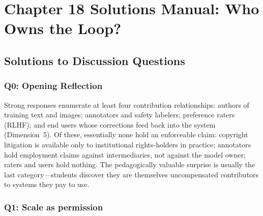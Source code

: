 
\section*{Chapter 18 Solutions Manual: Who Owns the Loop?}

\subsection*{Solutions to Discussion Questions}

\subsubsection*{Q0: Opening Reflection}

Strong responses enumerate at least four contribution relationships: authors of training text and images; annotators and safety labelers; preference raters (RLHF); and end users whose corrections feed back into the system (Dimension~5). Of these, essentially none hold an enforceable claim: copyright litigation is available only to institutional rights-holders in practice; annotators hold employment claims against intermediaries, not against the model owner; raters and users hold nothing. The pedagogically valuable surprise is usually the last category---students discover they are themselves uncompensated contributors to systems they pay to use.

\subsubsection*{Q1: Scale as permission}

